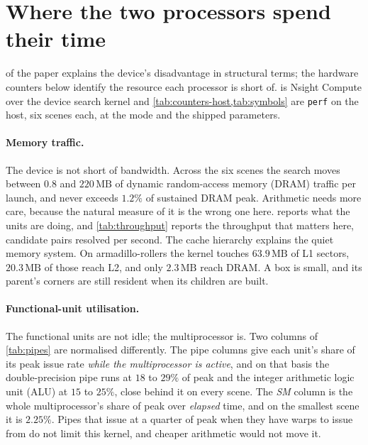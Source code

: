 \section{Where the two processors spend their time}
\label{sec:parallel:limits}

 of the paper explains the device's disadvantage in
structural terms; the hardware counters below identify the resource each
processor is short of.
 is Nsight Compute over the device search kernel and
\cref{tab:counters-host,tab:symbols} are \texttt{perf} on the host, six scenes
each, at the  mode and the shipped parameters.

\paragraph{Memory traffic.} The device is not short of bandwidth. Across the
six scenes the search moves between $0.8$ and $220\,\mathrm{MB}$ of dynamic
random-access memory (DRAM) traffic per launch, and never exceeds $1.2\%$ of
sustained DRAM peak. Arithmetic needs more care, because the natural measure of
it is the wrong one here.  reports what the units are doing, and
\cref{tab:throughput} reports the throughput that matters here, candidate pairs
resolved per second. The cache hierarchy explains the quiet memory system. On
armadillo-rollers the kernel touches $63.9\,\mathrm{MB}$ of L1 sectors,
$20.3\,\mathrm{MB}$ of those reach L2, and only $2.3\,\mathrm{MB}$ reach DRAM. A
box is small, and its parent's corners are still resident when its children are
built.

\paragraph{Functional-unit utilisation.} The functional units are not idle; the
multiprocessor is. Two columns of \cref{tab:pipes} are normalised differently.
The pipe columns give each unit's share of its peak issue rate \emph{while the
multiprocessor is active}, and on that basis the double-precision pipe runs at
$18$ to $29\%$ of peak and the integer arithmetic logic unit (ALU) at $15$ to
$25\%$, close behind it on every scene. The \emph{SM} column is the whole
multiprocessor's share of peak over \emph{elapsed} time, and on the smallest
scene it is $2.25\%$. Pipes that issue at a quarter of peak when they have warps
to issue from do not limit this kernel, and cheaper arithmetic would not move
it.

